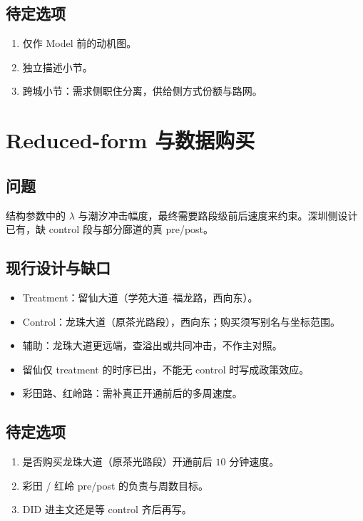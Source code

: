 \documentclass[11pt,a4paper]{article}
\begin{document}
\subsection*{待定选项}
\begin{enumerate}[nosep]
  \item 仅作 Model 前的动机图。
  \item 独立描述小节。
  \item 跨城小节：需求侧职住分离，供给侧方式份额与路网。
\end{enumerate}

\section{Reduced-form 与数据购买}

\subsection*{问题}
结构参数中的 $\lambda$ 与潮汐冲击幅度，最终需要路段级前后速度来约束。深圳侧设计已有，缺 control 段与部分廊道的真 pre/post。

\subsection*{现行设计与缺口}
\begin{itemize}[nosep]
  \item Treatment：留仙大道（学苑大道--福龙路，西向东）。
  \item Control：龙珠大道（原茶光路段），西向东；购买须写别名与坐标范围。
  \item 辅助：龙珠大道更远端，查溢出或共同冲击，不作主对照。
  \item 留仙仅 treatment 的时序已出，不能无 control 时写成政策效应。
  \item 彩田路、红岭路：需补真正开通前后的多周速度。
\end{itemize}

\subsection*{待定选项}
\begin{enumerate}[nosep]
  \item 是否购买龙珠大道（原茶光路段）开通前后 $10$ 分钟速度。
  \item 彩田 / 红岭 pre/post 的负责与周数目标。
  \item DID 进主文还是等 control 齐后再写。
\end{enumerate}
\end{document}
